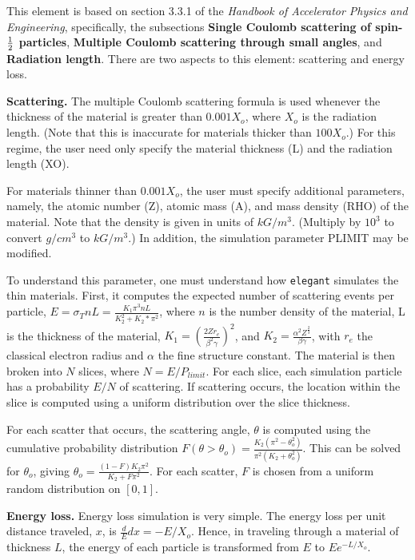 \documentclass[11pt,html]{article}
\begin{document}
This element is based on section 3.3.1 of the {\em Handbook of
Accelerator Physics and Engineering}, specifically, the
subsections {\bf Single Coulomb scattering of spin-${\rm \frac{1}{2}}$
particles}, {\bf Multiple Coulomb scattering through small angles},
and {\bf Radiation length}.
There are two aspects to this element: scattering and energy loss.

{\bf Scattering.}  The multiple Coulomb scattering formula is used
whenever the thickness of the material is greater than $0.001 X_o$,
where $X_o$ is the radiation length.  (Note that this is inaccurate
for materials thicker than $100 X_o$.)  For this regime, the user need
only specify the material thickness (L) and the radiation length (XO).

For materials thinner than $0.001 X_o$, the user must specify
additional parameters, namely, the atomic number (Z), atomic mass (A),
and mass density (RHO) of the material.  Note that the density is
given in units of $kG/m^3$.  (Multiply by $10^3$ to convert $g/cm^3$
to $kG/m^3$.)  In addition, the simulation parameter PLIMIT may be
modified.  

To understand this parameter, one must understand how {\tt elegant}
simulates the thin materials.  First, it computes the expected number
of scattering events per particle, $ E = \sigma_T n L = \frac{K_1
\pi^3 n L}{K_2^2 + K_2*\pi^2} $, where $n$ is the number density of
the material, L is the thickness of the material, $K_1 = (\frac{2 Z
r_e}{\beta^2 \gamma})^2$, and $K_2 = \frac{\alpha^2
Z^\frac{2}{3}}{\beta\gamma}$, with $r_e$ the classical electron radius
and $\alpha$ the fine structure constant.  The material is then broken
into $N$ slices, where $N = E/P_{limit}$.  For each slice, each
simulation particle has a probability $E/N$ of scattering.  If scattering
occurs, the location within the slice is computed using a uniform
distribution over the slice thickness.

For each scatter that occurs, the scattering angle, $\theta$ is
computed using the cumulative probability distribution
$F(\theta>\theta_o) = \frac{K_2 (\pi^2 - \theta_o^2)}{\pi^2 (K_2 +
\theta_o^2)}$.  This can be solved for $\theta_o$, giving
$\theta_o = \frac{(1-F)K_2\pi^2}{K_2 + F \pi^2}$.  For each scatter,
$F$ is chosen from a uniform random distribution on $[0,1]$.

{\bf Energy loss.}  Energy loss simulation is very simple.
The energy loss per unit distance traveled, $x$, is 
${\frac dE}{dx} = -E/X_o$.  Hence, in traveling through a
material of thickness $L$, the energy of each particle is
transformed from $E$ to $E e^{-L/X_o}$.  
\end{document}
